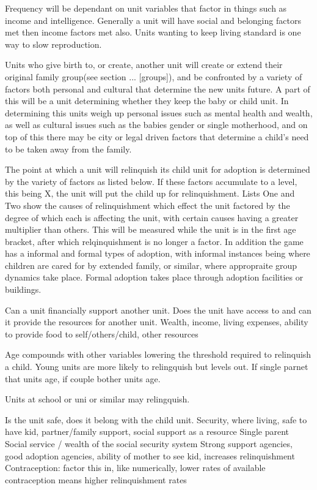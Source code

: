 Frequency will be dependant on unit variables that factor in things such as income and intelligence.
Generally a unit will have social and belonging factors met then income factors met also. 
Units wanting to keep living standard is one way to slow reproduction.

Units who give birth to, or create, another unit will create or extend their original family group(see section ... [groups]), and be confronted by a variety of factors both personal and cultural that determine the new units future. A part of this will be a unit determining whether they keep the baby or child unit. In determining this units weigh up personal issues such as mental health and wealth, as well as cultural issues such as the babies gender or single motherhood, and on top of this there may be city or legal driven factors that determine a child's need to be taken away from the family.

The point at which a unit will relinquish its child unit for adoption is determined by the variety of factors as listed below. If these factors accumulate to a level, this being X, the unit will put the child up for relinquishment. Lists One and Two show the causes of relinquishment which effect the unit factored by the degree of which each is affecting the unit, with certain causes having a greater multiplier than others. This will be measured while the unit is in the first age bracket, after which relqinquishment is no longer a factor.
In addition the game has a informal and formal types of adoption, with informal instances being where children are cared for by extended family, or similar, where appropraite group dynamics take place. Formal adoption takes place through adoption facilities or buildings.

Can a unit financially support another unit.
Does the unit have access to and can it provide the resources for another unit. 
 Wealth, income, living expenses, ability to provide food to self/others/child, other resources

Age compounds with other variables lowering the threshold required to relinquish a child. Young units are more likely to relingquish but levels out.
If single parnet that units age, if couple bother units age.

Units at school or uni or similar may relingquish.

Is the unit safe, does it belong with the child unit.
Security, where living, safe to have kid, partner/family support, social support as a resource
Single parent
Social service / wealth of the social security system
Strong support agencies, good adoption agencies, ability of mother to see kid, increases relinquishment
Contraception: factor this in, like numerically, lower rates of available contraception means higher relinquishment rates

